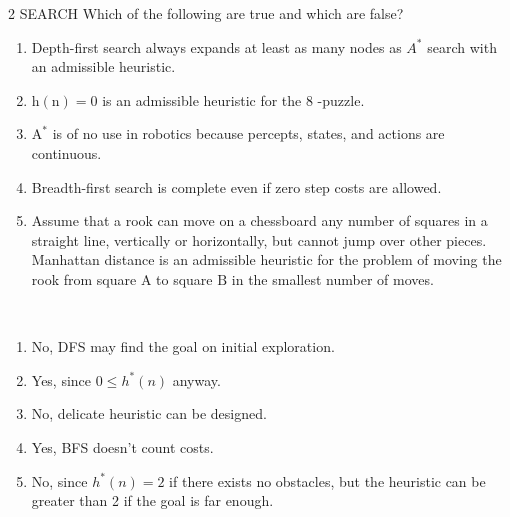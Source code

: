 \begin{exercise}[Search]{2 SEARCH Which of the following are true and which are false?
  \begin{enumerate}
    \item Depth-first search always expands at least as many nodes as $A^{*}$ search with an admissible heuristic.
    \item $\mathrm{h}(\mathrm{n})=0$ is an admissible heuristic for the 8 -puzzle.
    \item $\mathrm{A}^{*}$ is of no use in robotics because percepts, states, and actions are continuous.
    \item Breadth-first search is complete even if zero step costs are allowed.
    \item Assume that a rook can move on a chessboard any number of squares in a straight line, vertically or horizontally, but cannot jump over other pieces. Manhattan distance is an admissible heuristic for the problem of moving the rook from square A to square $\mathrm{B}$ in the smallest number of moves.
  \end{enumerate}}
  \begin{solution}
  \par{~}
  \begin{enumerate}
    \item No, DFS may find the goal on initial exploration.
    \item Yes, since $0 \le h^{*}(n)$ anyway.
    \item No, delicate heuristic can be designed.
    \item Yes, BFS doesn't count costs.
    \item No, since $h^{*}(n)=2$ if there exists no obstacles, but the heuristic can be greater than 2 if the goal is far enough.
  \end{enumerate}
  \end{solution}
  \label{ex2}
\end{exercise}


